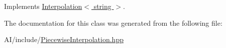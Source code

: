 Implements \hyperlink{class_interpolation_ac2e37b60de1c7b6704be643563fedd91}{Interpolation$<$ string $>$}.



The documentation for this class was generated from the following file\+:\begin{DoxyCompactItemize}
\item 
A\+I/include/\hyperlink{_piecewise_interpolation_8hpp}{Piecewise\+Interpolation.\+hpp}\end{DoxyCompactItemize}
